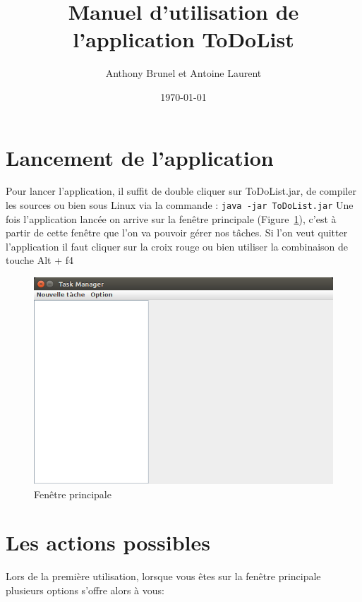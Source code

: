 \documentclass{article}
\title{Manuel d'utilisation de l'application ToDoList}
\author{Anthony Brunel et Antoine Laurent}
\date{\today}
\begin{document}
\maketitle
\newpage
\tableofcontents
\listoffigures
\newpage

\section{Lancement de l'application}
Pour lancer l'application, il suffit de double cliquer sur ToDoList.jar, de compiler les sources ou bien sous Linux via la commande : \verb+java -jar ToDoList.jar+
\newline
\newline
Une fois l'application lancée on arrive sur la fenêtre principale (Figure~\ref{Fenêtre principale}), c'est à partir de cette fenêtre que l'on va pouvoir gérer nos tâches. 
\newline
Si l'on veut quitter l'application il faut cliquer sur la croix rouge ou bien utiliser la combinaison de touche Alt + f4

\begin{figure}[h]
	\centering
	\includegraphics[scale=0.34]{images/MainDIsplay.png}
	\caption{Fenêtre principale}
	\label{Fenêtre principale}
\end{figure}

\section{Les actions possibles}
Lors de la première utilisation, lorsque vous êtes sur la fenêtre principale plusieurs options s'offre alors à vous:
\newline
\end{document}
